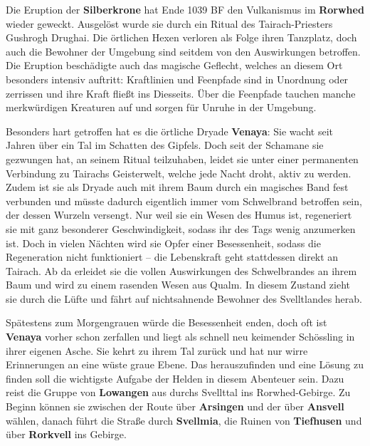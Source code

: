 \spaltenanfang



Die Eruption der \textbf{Silberkrone} hat Ende 1039 BF den Vulkanismus im \textbf{Rorwhed} wieder geweckt.
Ausgelöst wurde sie durch ein Ritual des Tairach-Priesters Gushrogh Drughai.
Die örtlichen Hexen verloren als Folge ihren Tanzplatz, doch auch die Bewohner der Umgebung sind seitdem von den Auswirkungen betroffen.
Die Eruption beschädigte auch das magische Geflecht, welches an diesem Ort besonders intensiv auftritt:
Kraftlinien und Feenpfade sind in Unordnung oder zerrissen und ihre Kraft fließt ins Diesseits.
Über die Feenpfade tauchen manche merkwürdigen Kreaturen auf und sorgen für Unruhe in der Umgebung.


Besonders hart getroffen hat es die örtliche Dryade \textbf{Venaya}:
Sie wacht seit Jahren über ein Tal im Schatten des Gipfels.
Doch seit der Schamane sie gezwungen hat, an seinem Ritual teilzuhaben, leidet sie unter einer permanenten Verbindung zu Tairachs Geisterwelt, welche jede Nacht droht, aktiv zu werden.
Zudem ist sie als Dryade auch mit ihrem Baum durch ein magisches Band fest verbunden und müsste dadurch eigentlich immer vom Schwelbrand betroffen sein, der dessen Wurzeln versengt.
Nur weil sie ein Wesen des Humus ist, regeneriert sie mit ganz besonderer Geschwindigkeit, sodass ihr des Tags wenig anzumerken ist.
Doch in vielen Nächten wird sie Opfer einer Besessenheit, sodass die Regeneration nicht funktioniert -- die Lebenskraft geht stattdessen direkt an Tairach.
Ab da erleidet sie die vollen Auswirkungen des Schwelbrandes an ihrem Baum und wird zu einem rasenden Wesen aus Qualm.
In diesem Zustand zieht sie durch die Lüfte und fährt auf nichtsahnende Bewohner des Svelltlandes herab.

\vfill

Spätestens zum Morgengrauen würde die Besessenheit enden, doch oft ist \textbf{Venaya} vorher schon zerfallen und liegt als schnell neu keimender Schössling in ihrer eigenen Asche.
Sie kehrt zu ihrem Tal zurück und hat nur wirre Erinnerungen an eine wüste graue Ebene.
Das herauszufinden und eine Lösung zu finden soll die wichtigste Aufgabe der Helden in diesem Abenteuer sein.
Dazu reist die Gruppe von \textbf{Lowangen} aus durchs Svellttal ins Rorwhed-Gebirge.
Zu Beginn können sie zwischen der Route über \textbf{Arsingen} und der über \textbf{Ansvell} wählen, danach führt die Straße durch \textbf{Svellmia}, die Ruinen von \textbf{Tiefhusen} und über \textbf{Rorkvell} ins Gebirge.

